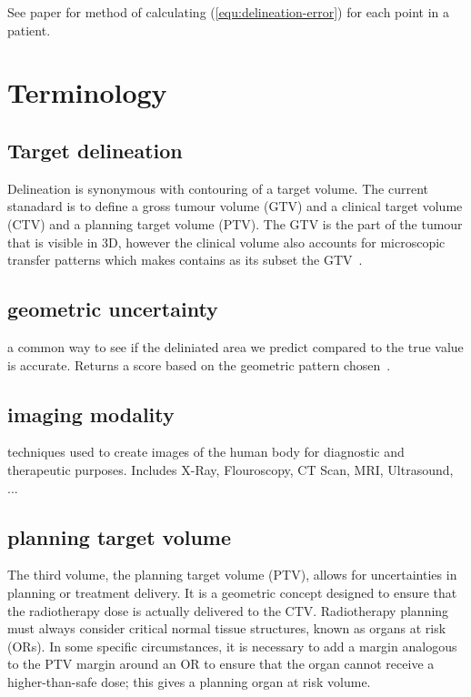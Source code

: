 \documentclass[11pt]{article}
\begin{document}
See paper for method of calculating (\ref{equ:delineation-error}) for each point in a patient.

\section{Terminology}

\subsection{Target delineation}\label{term:target-delineation}

Delineation is synonymous with contouring of a target volume. The current stanadard is to define a gross tumour volume (GTV) and a clinical target volume (CTV) and a planning target volume (PTV). The GTV is the part of the tumour that is visible in 3D, however the clinical volume also accounts for microscopic transfer patterns which makes contains as its subset the GTV~\cite{tumor-delineation}.

\subsection{geometric uncertainty}\label{term:geometric-uncertainty}

a common way to see if the deliniated area we predict compared to the true value is accurate. Returns a score based on the geometric pattern chosen~\cite{review-metrics}.

\subsection{imaging modality}\label{term:imaging-modality}

techniques used to create images of the human body for diagnostic and therapeutic purposes. Includes X-Ray, Flouroscopy, CT Scan, MRI, Ultrasound, ...~\cite{imaging-modality}

\subsection{planning target volume}\label{term:planning-target-volume}

The third volume, the planning target volume (PTV), allows for uncertainties in planning or treatment delivery. It is a geometric concept designed to ensure that the radiotherapy dose is actually delivered to the CTV. Radiotherapy planning must always consider critical normal tissue structures, known as organs at risk (ORs). In some specific circumstances, it is necessary to add a margin analogous to the PTV margin around an OR to ensure that the organ cannot receive a higher-than-safe dose; this gives a planning organ at risk volume.~\cite{defining-target-volumes}

\printbibliography
\end{document}

